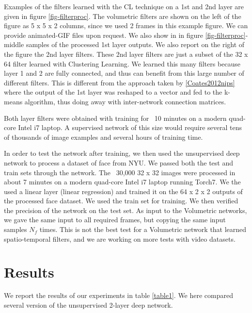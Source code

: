 \documentclass{article} %
\begin{document}
Examples of the filters learned with the CL technique on a 1st and 2nd layer are given in figure \ref{fig-filterproc}. The volumetric filters are shown on the left of the figure as 5 x 5 x 2 columns, since we used 2 frames in this example figure. We can provide animated-GIF files upon request. We also show in in figure \ref{fig-filterproc}-middle samples of the processed  1st layer outputs. We also report on the right of the figure the 2nd layer filters. These 2nd layer filters are just a subset of the 32 x 64 filter learned with Clustering Learning. We learned this many filters because layer 1 and 2 are fully connected, and thus can benefit from this large number of different filters. This is different from the approach taken by \ref{Coates2012nips} where the output of the 1st layer was reshaped to a vector and fed to the k-means algorithm, thus doing away with inter-network connection matrices. 

Both layer filters were obtained with training for ~10 minutes on a modern quad-core Intel i7 laptop. A supervised network of this size would require several tens of thousands of image examples and several hours of training time.

In order to test the network after training, we then used the unsupervised deep network to process a dataset of face from NYU. We passed both the test and train sets through the network. The ~30,000 32 x 32 images were processed in about 7 minutes on a modern quad-core Intel i7 laptop running Torch7. We the used a linear layer (linear regression) and trained it on the 64 x 2 x 2 outputs of the processed face dataset. We used the train set for training. We then verified the precision of the network on the test set.
As input to the Volumetric networks, we gave the same input to all required frames, but copying the same input samples $N_f$ times. This is not the best test for a Volumetric network that learned spatio-temporal filters, and we are working on more tests with video datasets.




\section{Results}
\label{sec-results}


We report the results of our experiments in table \ref{table1}. We here compared several version of the unsupervised 2-layer deep network. 
\end{document}

